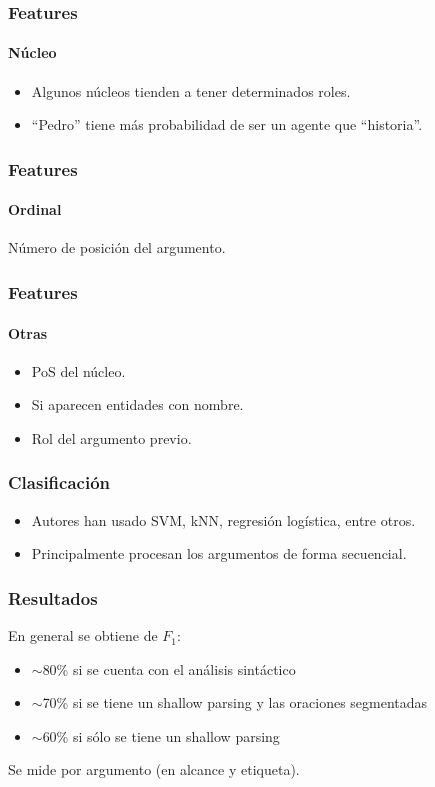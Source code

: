 \documentclass{beamer}
\begin{document}
\begin{frame}
  \frametitle{Features}
  \framesubtitle{Núcleo}

  \begin{itemize}
    \item Algunos núcleos tienden a tener determinados roles.
    \item ``Pedro'' tiene más probabilidad de ser un agente que ``historia''.
  \end{itemize}
\end{frame}

\begin{frame}
  \frametitle{Features}
  \framesubtitle{Ordinal}

  Número de posición del argumento.
\end{frame}

\begin{frame}
  \frametitle{Features}
  \framesubtitle{Otras}

  \begin{itemize}
    \item PoS del núcleo.

    \item Si aparecen entidades con nombre.

    \item Rol del argumento previo.
  \end{itemize}
\end{frame}

\begin{frame}
  \frametitle{Clasificación}

  \begin{itemize}
    \item Autores han usado SVM, kNN, regresión logística, entre otros.

    \item Principalmente procesan los argumentos de forma secuencial.
  \end{itemize}
\end{frame}

\begin{frame}
  \frametitle{Resultados}

  En general se obtiene de $F_1$:

  \begin{itemize}
    \item $\sim$80\% si se cuenta con el análisis sintáctico
    \item $\sim$70\% si se tiene un shallow parsing y las oraciones segmentadas
    \item $\sim$60\% si sólo se tiene un shallow parsing
  \end{itemize}

  Se mide por argumento (en alcance y etiqueta).
\end{frame}
\end{document}

